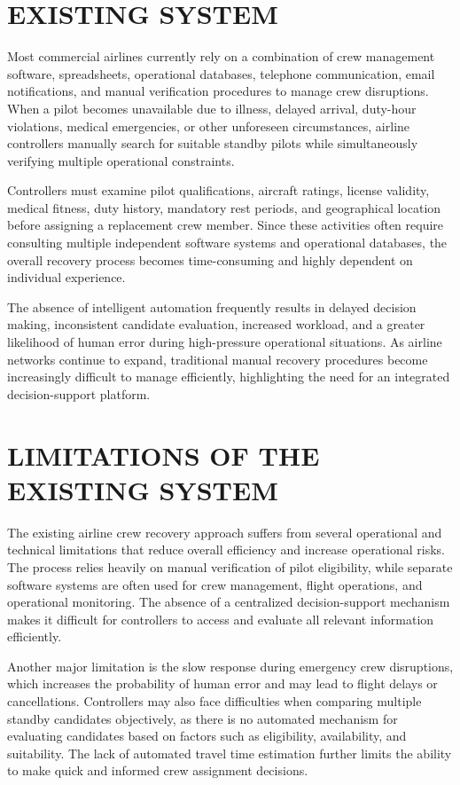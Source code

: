 \documentclass[12pt,a4paper]{report}
\begin{document}
\section{EXISTING SYSTEM}

Most commercial airlines currently rely on a combination of crew management software, spreadsheets, operational databases, telephone communication, email notifications, and manual verification procedures to manage crew disruptions. When a pilot becomes unavailable due to illness, delayed arrival, duty-hour violations, medical emergencies, or other unforeseen circumstances, airline controllers manually search for suitable standby pilots while simultaneously verifying multiple operational constraints.

Controllers must examine pilot qualifications, aircraft ratings, license validity, medical fitness, duty history, mandatory rest periods, and geographical location before assigning a replacement crew member. Since these activities often require consulting multiple independent software systems and operational databases, the overall recovery process becomes time-consuming and highly dependent on individual experience.

The absence of intelligent automation frequently results in delayed decision making, inconsistent candidate evaluation, increased workload, and a greater likelihood of human error during high-pressure operational situations. As airline networks continue to expand, traditional manual recovery procedures become increasingly difficult to manage efficiently, highlighting the need for an integrated decision-support platform.

\section{LIMITATIONS OF THE EXISTING SYSTEM}

The existing airline crew recovery approach suffers from several operational and technical limitations that reduce overall efficiency and increase operational risks. The process relies heavily on manual verification of pilot eligibility, while separate software systems are often used for crew management, flight operations, and operational monitoring. The absence of a centralized decision-support mechanism makes it difficult for controllers to access and evaluate all relevant information efficiently.

Another major limitation is the slow response during emergency crew disruptions, which increases the probability of human error and may lead to flight delays or cancellations. Controllers may also face difficulties when comparing multiple standby candidates objectively, as there is no automated mechanism for evaluating candidates based on factors such as eligibility, availability, and suitability. The lack of automated travel time estimation further limits the ability to make quick and informed crew assignment decisions.
\end{document}
